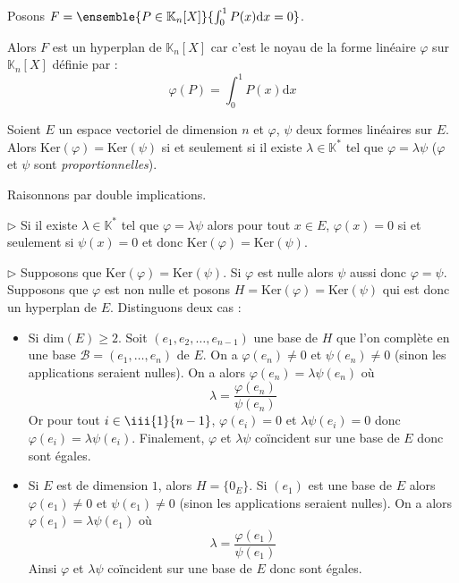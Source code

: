 \documentclass[french,11pt,twoside]{VcCours}
\newcommand{\dx}{\text{d}x}
\renewcommand{\trou}[1]{{\color{blue}#1}}
\begin{document}
\begin{Exemple} Posons $F = \ensemble{P \in \mathbb{K}_n[X]}{\int_{0}^1 P(x) \dx =0}$.

\trou{
Alors $F$ est un hyperplan de $\mathbb{K}_n[X]$ car c'est le noyau de la forme linéaire $\varphi$ sur $\mathbb{K}_n[X]$ définie par :
$$\varphi(P) = \int_{0}^1 P(x) \dx$$
}
\end{Exemple}

\begin{Proposition}{} Soient $E$ un espace vectoriel de dimension $n$ et $\varphi$, $\psi$ deux formes linéaires sur $E$. Alors $\textrm{Ker}(\varphi) = \textrm{Ker}(\psi)$ si et seulement si il existe $\lambda \in \mathbb{K}^*$ tel que $\varphi = \lambda \psi$ ($\varphi$ et $\psi$ sont \emph{proportionnelles}).
\end{Proposition}

\begin{Demonstration}{} Raisonnons par double implications.

\trou{
$\rhd$ Si il existe $\lambda \in \mathbb{K}^*$ tel que $\varphi = \lambda \psi$ alors pour tout $x \in E$, $\varphi(x) = 0$ si et seulement si $\psi(x)=0$ et donc $\textrm{Ker}(\varphi) = \textrm{Ker}(\psi)$.

\medskip $\rhd$ Supposons que $\textrm{Ker}(\varphi) = \textrm{Ker}(\psi)$. Si $\varphi$ est nulle alors $\psi$ aussi donc $\varphi= \psi$. Supposons que $\varphi$ est non nulle et posons $H = \textrm{Ker}(\varphi) = \textrm{Ker}(\psi)$ qui est donc un hyperplan de $E$. Distinguons deux cas :

\begin{itemize}
\item Si $\textrm{dim}(E) \geq 2$. Soit $(e_1, e_2, \ldots, e_{n-1})$ une base de $H$ que l'on complète en une base $\mathcal{B}= (e_1, \ldots,e_n)$ de $E$. On a $\varphi(e_n) \neq 0$ et $\psi(e_n) \neq 0$ (sinon les applications seraient nulles). On a alors $\varphi(e_n) = \lambda \psi(e_n)$ où 
$$ \lambda = \frac{\varphi(e_n)}{\psi(e_n)}$$
Or pour tout $i \in \iii{1}{n-1}$, $\varphi(e_i)=0$ et $\lambda \psi (e_i)=0$ donc $\varphi(e_i)=\lambda \psi (e_i)$. Finalement, $\varphi$ et $\lambda \psi$ coïncident sur une base de $E$ donc sont égales.
\item Si $E$ est de dimension $1$, alors $H = \lbrace 0_E \rbrace$. Si $(e_1)$ est une base de $E$ alors $\varphi(e_1) \neq 0$ et $\psi(e_1) \neq 0$ (sinon les applications seraient nulles). On a alors $\varphi(e_1) = \lambda \psi(e_1)$ où 
$$ \lambda = \frac{\varphi(e_1)}{\psi(e_1)}$$
Ainsi $\varphi$ et $\lambda \psi$ coïncident sur une base de $E$ donc sont égales.
\end{itemize}
}
\end{Demonstration}
\end{document}

